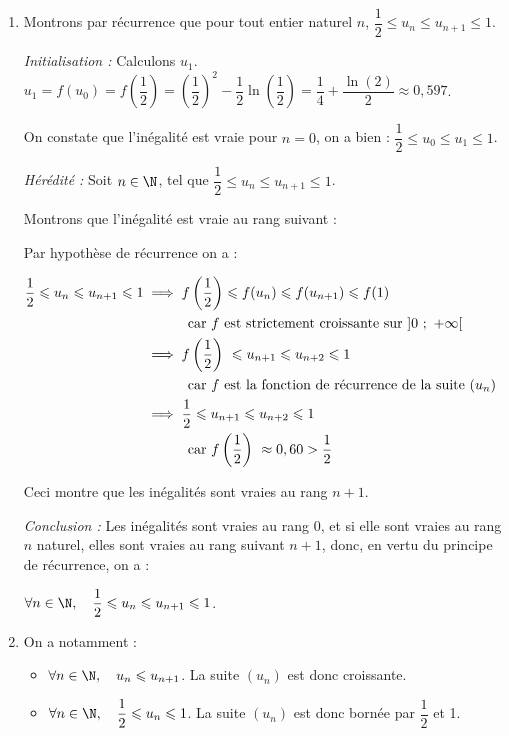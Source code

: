 \begin{enumerate}
	\item Montrons par récurrence que pour tout entier naturel  $n$, \quad$\dfrac{1}{2} \leqslant u_n \leqslant u_{n+1} \leqslant 1$.



\emph{Initialisation :} Calculons $u_1$. $u_1 = f(u_0) = f\left(\dfrac{1}{2} \right) = \left(\dfrac{1}{2}\right)^2-\dfrac{1}{2}\ln \left(\dfrac{1}{2}\right)= \dfrac{1}{4} +\dfrac{\ln(2)}{2}\approx 0,597 $.

On constate que l'inégalité est vraie pour $n = 0$, on a bien : \quad $ \dfrac{1}{2}\leqslant u_0 \leqslant u_1 \leqslant 1$.

\smallskip

\emph{Hérédité :} Soit $n \in \N$, tel que \quad $ \dfrac{1}{2}\leqslant u_n \leqslant u_{n+1} \leqslant 1$.

Montrons que l'inégalité est vraie au rang suivant :

Par hypothèse de récurrence on a :

$ \begin{aligned}[t] \dfrac{1}{2}\leqslant u_n \leqslant u_{n+1} \leqslant 1
&\implies f\left(\dfrac{1}{2}\right)\leqslant f(u_n) \leqslant f(u_{n+1}) \leqslant f(1)\\
&\hphantom{\implies}\quad \text{car $f$ est strictement croissante sur }]0~;~+\infty[\\
&\implies f\left(\dfrac{1}{2}\right)\ \leqslant u_{n+1 } \leqslant u_{n+2} \leqslant 1\\
&\hphantom{\implies}\quad \text{car $f$ est la fonction de récurrence de la suite } (u_n)\\
&\implies \dfrac{1}{2} \leqslant u_{n+1 } \leqslant u_{n+2} \leqslant 1\\
&\hphantom{\implies}\quad \text{car } f\left(\dfrac{1}{2}\right)\ \approx 0,60 >\dfrac{1}{2} \\\end{aligned}$

Ceci montre que les  inégalités sont vraies au rang $n + 1$.

\smallskip

\emph{Conclusion :} Les inégalités sont vraies au rang 0, et si elle sont vraies au rang $n$ naturel, elles sont vraies au rang suivant $n + 1$, donc, en vertu du principe de récurrence, on a :

$\forall n \in \N,\quad \dfrac{1}{2} \leqslant u_{n} \leqslant u_{n+1} \leqslant 1$.

	\item On a notamment :
		\begin{itemize}
			\item $\forall n \in \N,\quad u_{n} \leqslant u_{n+1}$. \quad La suite $(u_n)$ est donc  croissante.
			\item $\forall n \in \N,\quad \dfrac{1}{2} \leqslant u_{n}\leqslant 1$. \quad La suite $\left(u_n\right)$ est donc bornée par $\dfrac{1}{2}$ et 1.
		\end{itemize}


\end{enumerate}
